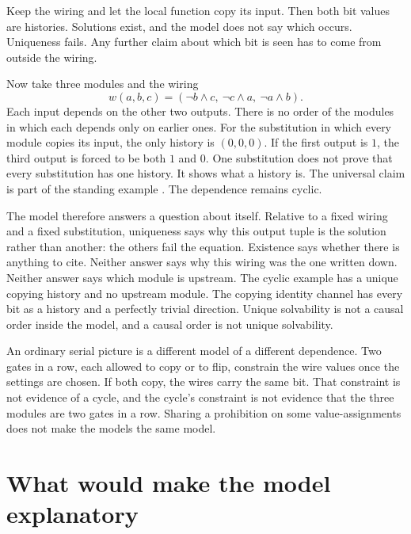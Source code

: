 \documentclass[12pt]{article}
\begin{document}
Keep the wiring and let the local function copy its input. Then both bit values are histories. Solutions exist, and the model does not say which occurs. Uniqueness fails. Any further claim about which bit is seen has to come from outside the wiring.

Now take three modules and the wiring
\[
w(a,b,c)=(\lnot b \land c,\ \lnot c \land a,\ \lnot a \land b).
\]
Each input depends on the other two outputs. There is no order of the modules in which each depends only on earlier ones. For the substitution in which every module copies its input, the only history is \((0,0,0)\). If the first output is \(1\), the third output is forced to be both \(1\) and \(0\). One substitution does not prove that every substitution has one history. It shows what a history is. The universal claim is part of the standing example \citep{baumeler2016,baumeler2019}. The dependence remains cyclic.

The model therefore answers a question about itself. Relative to a fixed wiring and a fixed substitution, uniqueness says why this output tuple is the solution rather than another: the others fail the equation. Existence says whether there is anything to cite. Neither answer says why this wiring was the one written down. Neither answer says which module is upstream. The cyclic example has a unique copying history and no upstream module. The copying identity channel has every bit as a history and a perfectly trivial direction. Unique solvability is not a causal order inside the model, and a causal order is not unique solvability.

An ordinary serial picture is a different model of a different dependence. Two gates in a row, each allowed to copy or to flip, constrain the wire values once the settings are chosen. If both copy, the wires carry the same bit. That constraint is not evidence of a cycle, and the cycle's constraint is not evidence that the three modules are two gates in a row. Sharing a prohibition on some value-assignments does not make the models the same model.

\section{What would make the model explanatory}
\label{sec:bok}
\end{document}
